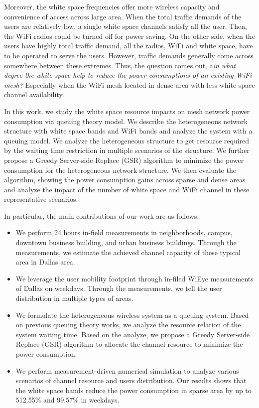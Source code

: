 Moreover, the white space frequencies offer more wireless capacity and convenience of access across large 
area. When the total traffic demands of the users are relatively low, a single white space channels satisfy 
all the user. Then, the WiFi radios could be turned off for power saving. On the other side, when the users 
have highly total traffic demand, all the radios, WiFi and white space, have to be operated to serve the users. 
However, traffic demands generally come across somewhere between these extremes. Thus, the question comes out, 
a{\it in what degree the white space help to reduce the power consumptions of an existing WiFi mesh?}
Especially when the WiFi mesh located in dense area with less white space channel availability.

In this work, we study the white space resource impacts on mesh network power consumption via queuing theory model.
We describe the heterogeneous network structure with white space bands and WiFi bands and analyze the 
system with a queuing model. We analyze the heterogeneous structure to get resource required by the waiting 
time restriction in multiple scenarios of the structure. We further propose a Greedy Server-side Replace (GSR) 
algorithm to minimize the power consumption for the heterogeneous network structure. 
We then evaluate the algorithm, showing the power consumption gains across sparse and dense areas and 
analyze the impact of the number of white space and WiFi channel in these representative scenarios.

In particular, the main contributions of our work are as follows:
\begin{itemize}
\item We perform 24 hours in-field measurements in neighborhoods, campus, downtown business building, 
and urban business buildings. Through the measurements, we estimate the achieved channel capacity of 
these typical area in Dallas area.
\item We leverage the user mobility footprint through in-filed WiEye measurements of Dallas on weekdays. 
Through the measurements, we tell the user distribution in multiple types of areas. 
\item 
We formulate the heterogeneous wireless system as a queuing system. Based on previous queuing theory works, we 
analyze the resource relation of the system waiting time. Based on the analyze, we propose a Greedy Server-side Replace 
(GSR) algorithm to allocate the channel resource to minimize the power consumption.
\item We perform measurement-driven numerical simulation to analyze various scenarios of channel resource and 
users distribution. Our results shows that the white space bands reduce the power consumption in
sparse area by up to 512.55\% and 99.57\% in weekdays.
\end{itemize}


